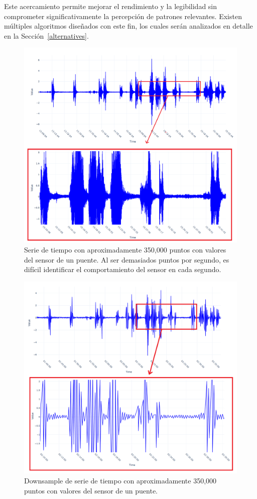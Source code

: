 Este acercamiento permite mejorar el rendimiento y la legibilidad sin comprometer significativamente la percepción de patrones relevantes. Existen múltiples algoritmos diseñados con este fin, los cuales serán analizados en detalle en la Sección~\ref{alternatives}.

\begin{figure}[H]
    \centering
    \includegraphics[width=0.9\linewidth]{introduction/images/squashed_plot.png}
    \caption[Serie de Tiempo Sin Downsample]{Serie de tiempo con aproximadamente 350,000 puntos con valores del sensor de un puente. Al ser demasiados puntos por segundo, es difícil identificar el comportamiento del sensor en cada segundo.}
    \label{squashed_plot}
\end{figure}

\begin{figure}[H]
    \centering
    \includegraphics[width=0.9\linewidth]{introduction/images/downsample.png}
    \caption[Serie de Tiempo Con Downsample]{Downsample de serie de tiempo con aproximadamente 350,000 puntos con valores del sensor de un puente.}
    \label{downsample}
\end{figure}

